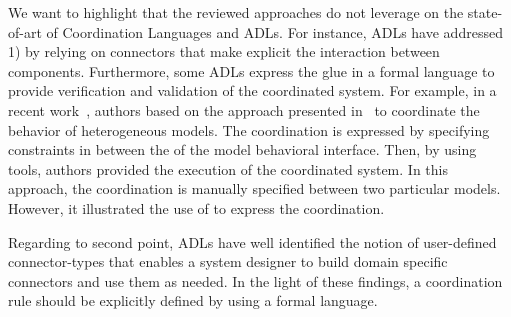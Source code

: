 We want to highlight that the reviewed approaches do not leverage on the state-of-art of Coordination Languages and ADLs. For instance, ADLs have addressed 1) by relying on connectors that make explicit the interaction between components. Furthermore, some ADLs express the glue in a formal language to provide verification and validation of the coordinated system. For example, in a recent work~\cite{varagemoc13bib}, authors based on the approach presented in~\cite{sle13-combemale} to coordinate the behavior of heterogeneous models. The coordination is expressed by specifying constraints in \ccsl between the \mse of the model behavioral interface. Then, by using \ccsl tools, authors provided the execution of the coordinated system. In this approach, the coordination is manually specified between two particular models. However, it illustrated the use of \ccsl to express the coordination.  
		
Regarding to second point, ADLs have well identified the notion of user-defined connector-types that enables a system designer to build domain specific connectors and use them as needed. In the light of these findings, a coordination rule should be explicitly defined by using a formal language.
     
		
	 	
 		 		
 		
 		
 		
